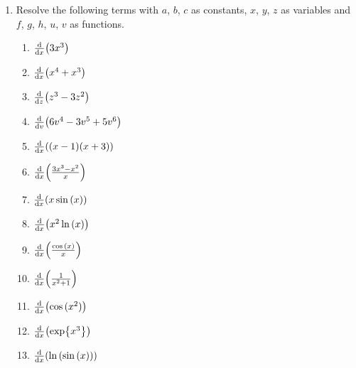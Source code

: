 \documentclass{article}
\begin{document}
{\begin{multicols}{4}
\begin{enumerate}
\begin{enumerate}
		    \item $x^n$
		    \item $f+g$
		    \item $f-g$
		    \item $f\times g$
		    \item $\frac{f}{g}$
		    \item $\frac{1}{f}$
		    \item $f(g(x))$
		\end{enumerate}
		\item Resolve the following terms with $a$, $b$, $c$ as constants, $x$, $y$, $z$ as variables and $f$, $g$, $h$, $u$, $v$ as functions.
		\begin{enumerate}
		    \item $\dv{x}({3x^3})$
		    \item $\dv{x}({x^4+x^3})$
		    \item $\dv{z}({z^3-3z^2})$
		    \item $\dv{v}({6v^4-3v^5+5v^6})$
		    \item $\dv{x}({(x-1)(x+3)})$
		    \item $\dv{x}({\frac{3x^3-x^2}{x}})$
		    \item $\dv{x}({x\sin{(x)}})$
		    \item $\dv{x}({x^2\ln{(x)}})$
		    \item $\dv{x}({\frac{\cos {(x)}}{x}})$
		    \item $\dv{x}({\frac{1}{x^2+1}})$
		    \item $\dv{x}({\cos{(x^2)}})$
		    \item $\dv{x}({\exp{x^3}})$
		    \item $\dv{x}({\ln{(\sin{(x)})}})$
		\end{enumerate}
		\end{enumerate}
		\end{multicols}

		
		\clearpage
	}
\end{document}
